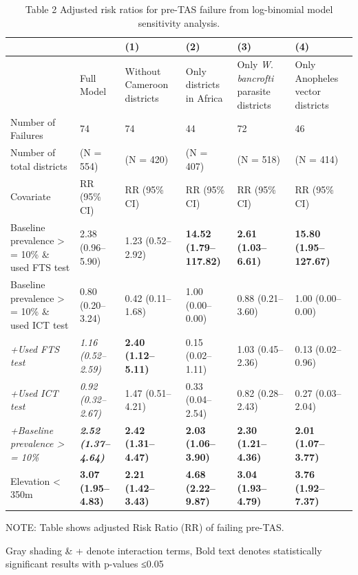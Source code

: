 \documentclass[11pt,a4paper]{article}
\begin{document}
\begin{table}[h]
\caption{Table 2 Adjusted risk ratios for pre-TAS failure from log-binomial model sensitivity analysis.}
\begin{tabular}{|l|l|l|l|l|l|}
\hline
 &  & (1) & (2) & (3) & (4) \\ \hline
 & Full Model & Without Cameroon districts & Only districts in Africa & Only \textit{W}. \textit{bancrofti} parasite districts & Only Anopheles vector districts \\ \hline
Number of Failures & 74 & 74 & 44 & 72 & 46 \\ \hline
Number of total districts & (N = 554) & (N = 420) & (N = 407) & (N = 518) & (N = 414) \\ \hline
Covariate & RR (95\% CI) & RR (95\% CI) & RR (95\% CI) & RR (95\% CI) & RR (95\% CI) \\ \hline
Baseline prevalence > = 10\% \& used FTS test & 2.38 (0.96–5.90) & 1.23 (0.52–2.92) & \textbf{14.52 (1.79–117.82)} & \textbf{2.61 (1.03–6.61)} & \textbf{15.80 (1.95–127.67)} \\ \hline
Baseline prevalence > = 10\% \& used ICT test & 0.80 (0.20–3.24) & 0.42 (0.11–1.68) & 1.00 (0.00–0.00) & 0.88 (0.21–3.60) & 1.00 (0.00–0.00) \\ \hline
\textit{+Used FTS test} & \textit{1}.\textit{16 (0}.\textit{52–2}.\textit{59)} & \textbf{2.40 (1.12–5.11)} & 0.15 (0.02–1.11) & 1.03 (0.45–2.36) & 0.13 (0.02–0.96) \\ \hline
\textit{+Used ICT test} & \textit{0}.\textit{92 (0}.\textit{32–2}.\textit{67)} & 1.47 (0.51–4.21) & 0.33 (0.04–2.54) & 0.82 (0.28–2.43) & 0.27 (0.03–2.04) \\ \hline
\textit{+Baseline prevalence > = 10\%} & \textit{\textbf{2}}\textbf{.}\textit{\textbf{52 (1}}\textbf{.}\textit{\textbf{37–4}}\textbf{.}\textit{\textbf{64)}} & \textbf{2.42 (1.31–4.47)} & \textbf{2.03 (1.06–3.90)} & \textbf{2.30 (1.21–4.36)} & \textbf{2.01 (1.07–3.77)} \\ \hline
Elevation < 350m & \textbf{3.07 (1.95–4.83)} & \textbf{2.21 (1.42–3.43)} & \textbf{4.68 (2.22–9.87)} & \textbf{3.04 (1.93–4.79)} & \textbf{3.76 (1.92–7.37)} \\ \hline
\end{tabular}
\end{table}

NOTE: Table shows adjusted Risk Ratio (RR) of failing pre-TAS.

Gray shading \& + denote interaction terms, Bold text denotes statistically significant results with p-values ≤0.05
\end{document}
